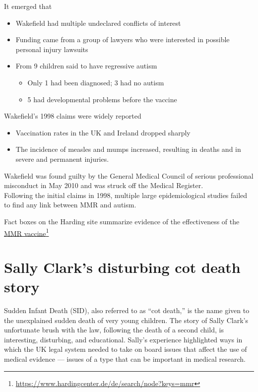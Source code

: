 \documentclass[
  10pt,
  b5paper]{book}
\providecommand{\tightlist}{%
  \setlength{\itemsep}{0pt}\setlength{\parskip}{0pt}}
\begin{document}
It emerged that

\begin{itemize}
\tightlist
\item
  Wakefield had multiple undeclared conflicts of interest
\item
  Funding came from a group of lawyers who were interested
  in possible personal injury lawsuits
\item
  From 9 children said to have regressive autism

  \begin{itemize}
  \tightlist
  \item
    Only 1 had been diagnosed; 3 had no autism
  \item
    5 had developmental problems before the vaccine
  \end{itemize}
\end{itemize}

Wakefield's 1998 claims were widely reported

\begin{itemize}
\tightlist
\item
  Vaccination rates in the UK and Ireland dropped sharply
\item
  The incidence of measles and mumps increased, resulting
  in deaths and in severe and permanent injuries.
\end{itemize}

Wakefield was found guilty by the General Medical Council of serious professional misconduct in May 2010 and was struck off the Medical Register.\\
Following the initial claims in 1998, multiple large epidemiological studies failed to find any link between MMR and autism.

Fact boxes on the Harding site summarize evidence of the
effectiveness of the \href{https://www.hardingcenter.de/de/search/node?keys=mmr}{MMR vaccine}\footnote{\url{https://www.hardingcenter.de/de/search/node?keys=mmr}}

\hypertarget{sally-clarks-disturbing-cot-death-story}{%
\section{Sally Clark's disturbing cot death story}\label{sally-clarks-disturbing-cot-death-story}}

Sudden Infant Death (SID), also referred to as ``cot death,''
is the name given to the unexplained sudden death of very
young children. The story of Sally Clark's unfortunate brush
with the law, following the death of a second child, is
interesting, disturbing, and educational. Sally's experience
highlighted ways in which the UK legal system needed to take
on board issues that affect the use of medical evidence ---
issues of a type that can be important in medical research.
\end{document}
